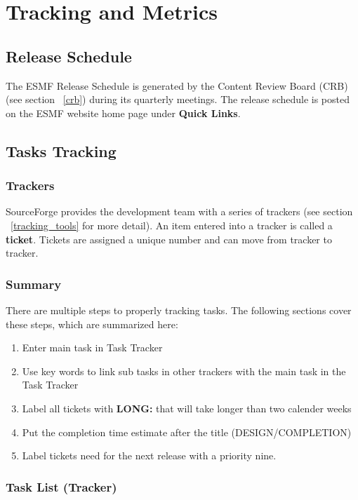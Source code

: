 
\section{Tracking and Metrics}


\subsection{Release Schedule}
\label{sec:build}
The ESMF Release Schedule is generated by the Content Review Board (CRB) (see section ~\ref{crb}) during its quarterly meetings.  The release schedule is posted on the ESMF website home page under {\bf Quick Links}.

\subsection{Tasks Tracking}
\label{tracking}

\subsubsection{Trackers}
SourceForge provides the development team with a series of trackers (see section ~\ref{tracking_tools} for more detail). An item entered into a tracker is
called a {\bf ticket}. Tickets are assigned a unique number and can move from tracker to tracker. 

\subsubsection{Summary}
There are multiple steps to properly tracking tasks. The following sections cover these steps, which are summarized here:
\begin{enumerate}
\item Enter main task in Task Tracker
\item Use key words to link sub tasks in other trackers with the main task in the Task Tracker
\item Label all tickets with {\bf LONG:} that will take longer than two calender weeks
\item Put the completion time estimate after the title (DESIGN/COMPLETION)
\item Label tickets need for the next release with a priority nine.
\end {enumerate}

\subsubsection{Task List (Tracker)}

